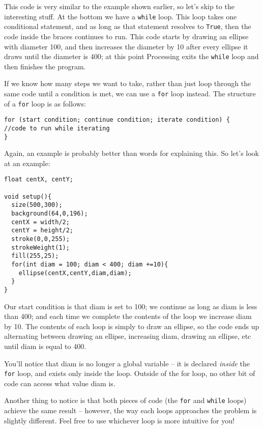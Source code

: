 This code is very similar to the example shown earlier, so let's skip to the interesting stuff.  At the bottom we have a \texttt{while} loop.  This loop takes one conditional statement, and as long as that statement resolves to \texttt{True}, then the code inside the braces continues to run.  This code starts by drawing an ellipse with diameter 100, and then increases the diameter by 10 after every ellipse it draws until the diameter is 400; at this point Processing exits the \texttt{while} loop and then finishes the program.

If we know how many steps we want to take, rather than just loop through the same code until a condition is met, we can use a \texttt{for} loop instead.  The structure of a \texttt{for} loop is as follows:

\begin{verbatim}
for (start condition; continue condition; iterate condition) {
//code to run while iterating
}
\end{verbatim}

Again, an example is probably better than words for explaining this.  So let's look at an example:

\begin{verbatim}
float centX, centY;

void setup(){
  size(500,300);
  background(64,0,196);
  centX = width/2;
  centY = height/2;
  stroke(0,0,255);
  strokeWeight(1);
  fill(255,25);
  for(int diam = 100; diam < 400; diam +=10){
    ellipse(centX,centY,diam,diam);
  }
}
\end{verbatim}

Our start condition is that diam is set to 100; we continue as long as diam is less than 400; and each time we complete the contents of the loop we increase diam by 10.  The contents of each loop is simply to draw an ellipse, so the code ends up alternating between drawing an ellipse, increasing diam, drawing an ellipse, etc until diam is equal to 400.

You'll notice that diam is no longer a global variable -- it is declared \emph{inside} the \texttt{for} loop, and exists only inside the loop.  Outside of the for loop, no other bit of code can access what value diam is.

Another thing to notice is that both pieces of code (the \texttt{for} and \texttt{while} loops) achieve the same result -- however, the way each loops approaches the problem is slightly different.  Feel free to use whichever loop is more intuitive for you!


